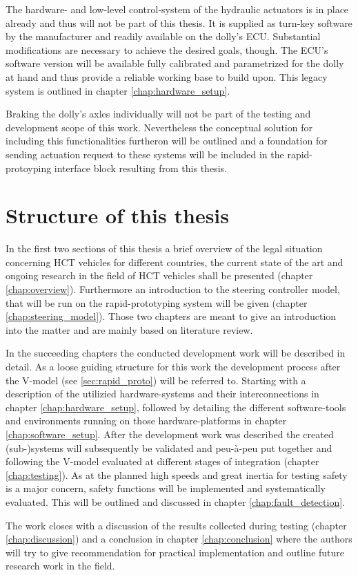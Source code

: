 \documentclass[ExampleMasters.tex]{subfiles}
\begin{document}
The hardware- and low-level control-system of the hydraulic actuators is in place already and thus will not be part of this thesis. It is supplied as turn-key software by the manufacturer and readily available on the dolly's \gls{ECU}. Substantial modifications are necessary to achieve the desired goals, though. The \gls{ECU}'s software version will be available fully calibrated and parametrized for the dolly at hand and thus provide a reliable working base to build upon. This legacy system is outlined in chapter \ref{chap:hardware_setup}.

Braking the dolly's axles individually will not be part of the testing and development scope of this work. Nevertheless the conceptual solution for including this functionalities furtheron will be outlined and a foundation for sending actuation request to these systems will be included in the rapid-protoyping interface block resulting from this thesis. 


\section{Structure of this thesis}
\label{sec:structure}

In the first two sections of this thesis a brief overview of the legal situation concerning \gls{HCT} vehicles for different countries, the current state of the art and ongoing research in the field of \gls{HCT} vehicles shall be presented (chapter \ref{chap:overview}). Furthermore an introduction to the steering controller model, that will be run on the rapid-prototyping system will be given (chapter \ref{chap:steering_model}). Those two chapters are meant to give an introduction into the matter and are mainly based on literature review. 

In the succeeding chapters the conducted development work will be described in detail. As a loose guiding structure for this work the development process after the V-model (see \ref{sec:rapid_proto}) will be referred to. Starting with a description of the utilizied hardware-systems and their interconnections in chapter \ref{chap:hardware_setup}, followed by detailing the different software-tools and environments running on those hardware-platforms in chapter \ref{chap:software_setup}. After the development work was described the created (sub-)systems will subsequently be validated and peu-\`{a}-peu put together and following the V-model evaluated at different stages of integration (chapter \ref{chap:testing}). As at the planned high speeds and great inertia for testing safety is a major concern, safety functions will be implemented and systematically evaluated. This will be outlined and discussed in chapter \ref{chap:fault_detection}.  

The work closes with a discussion of the results collected during testing (chapter \ref{chap:discussion}) and a conclusion in chapter \ref{chap:conclusion} where the authors will try to give recommendation for practical implementation and outline future research work in the field.
\end{document}
